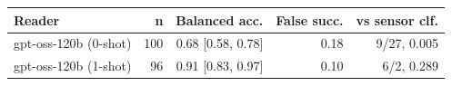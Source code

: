 \begin{tabular}{lrrrr}
\toprule
Reader & n & Balanced acc. & False succ. & vs sensor clf. \\
\midrule
gpt-oss-120b (0-shot) & 100 & 0.68 [0.58, 0.78] & 0.18 & 9/27, 0.005 \\
gpt-oss-120b (1-shot) & 96 & 0.91 [0.83, 0.97] & 0.10 & 6/2, 0.289 \\
\bottomrule
\end{tabular}
